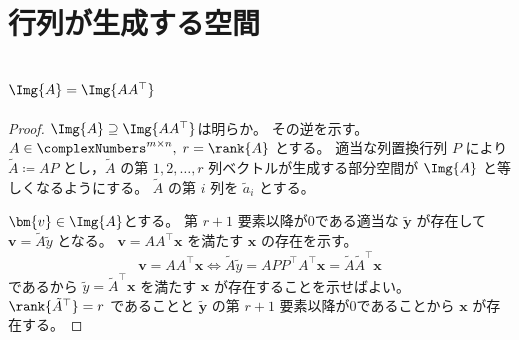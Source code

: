 \chapter{行列が生成する空間}
    \section{\texorpdfstring{$\Img{A}=\Img{AA^\top}$}{Img(A)=Img(AA\string^T)}}
        \begin{proof}
            \quad\par
            $\Img{A}\supseteq\Img{AA^\top}$は明らか。
            その逆を示す。
            $A\in\complexNumbers^{m\times n},\;r=\rank{A}$ とする。
            適当な列置換行列 $P$ により$\tilde{A} \coloneq AP$ とし，$\tilde{A}$ の第 $1,2,\dots,r$ 列ベクトルが生成する部分空間が $\Img{A}$ と等しくなるようにする。
            $\tilde{A}$ の第 $i$ 列を $\tilde{a}_i$ とする。
            \par
            $\bm{v}\in\Img{A}$とする。
            第 $r+1$ 要素以降が0である適当な $\tilde{\bm{y}}$ が存在して $\bm{v}=\tilde{A}\tilde{y}$ となる。
            $\bm{v} = AA^\top\bm{x}$ を満たす $\bm{x}$ の存在を示す。
            \[ \bm{v} = AA^\top\bm{x} \iff \tilde{A}\tilde{y} = APP^\top A^\top\bm{x} = \tilde{A}\tilde{A}^\top\bm{x} \]
            であるから $\tilde{y} = \tilde{A}^\top\bm{x}$ を満たす $\bm{x}$ が存在することを示せばよい。
            $\rank{\tilde{A}^\top} = r$ であることと $\tilde{\bm{y}}$ の第 $r+1$ 要素以降が0であることから $\bm{x}$ が存在する。
        \end{proof}